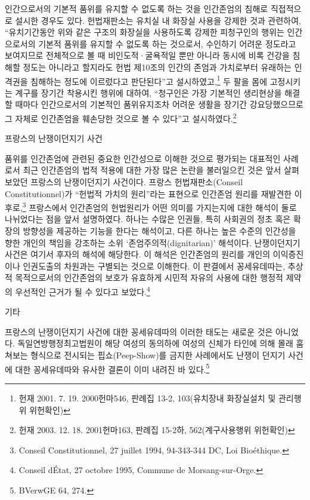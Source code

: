 인간으로서의 기본적 품위를 유지할 수 없도록 하는 것을 인간존엄의 침해로 직접적으로 설시한 경우도 있다. 헌법재판소는 유치실 내 화장실 사용을 강제한 것과 관련하여, ``유치기간동안 위와 같은 구조의 화장실을 사용하도록 강제한 피청구인의 행위는 인간으로서의 기본적 품위를 유지할 수 없도록 하는 것으로서, 수인하기 어려운 정도라고 보여지므로 전체적으로 볼 때 비인도적·굴욕적일 뿐만 아니라 동시에 비록 건강을 침해할 정도는 아니라고 할지라도 헌법 제10조의 인간의 존엄과 가치로부터 유래하는 인격권을 침해하는 정도에 이르렀다고 판단된다''고 설시하였고,\footnote{헌재 2001. 7. 19. 2000헌마546, 판례집 13-2, 103(유치장내 화장실설치 및 관리행위 위헌확인)} 두 팔을 몸에 고정시키는 계구를 장기간 착용시킨 행위에 대하여, ``청구인은 가장 기본적인 생리현상을 해결할 때마다 인간으로서의 기본적인 품위유지조차 어려운 생활을 장기간 강요당했으므로 그 자체로 인간존엄을 훼손당한 것으로 볼 수 있다''고 설시하였다.\footnote{헌재 2003. 12. 18. 2001헌마163, 판례집 15-2하, 562(계구사용행위 위헌확인)}

프랑스의 난쟁이던지기 사건

품위를 인간존엄에 관련된 중요한 인간성으로 이해한 것으로 평가되는 대표적인 사례로서 최근 인간존엄의 법적 적용에 대한 가장 많은 논란을 불러일으킨 것은 앞서 살펴보았던 프랑스의 난쟁이던지기 사건이다. 프랑스 헌법재판소(Conseil Constitutionnel)가 ``헌법적 가치의 원리''라는 표현으로 인간존엄 원리를 재발견한 이후로,\footnote{Conseil Constitutionnel, 27 juillet 1994, 94-343-344 DC, Loi Bioéthique.} 프랑스에서 인간존엄의 헌법원리가 어떤 의미를 가지는지에 대한 해석이 둘로 나뉘었다는 점을 앞서 설명하였다. 하나는 수많은 인권들, 특히 사회권의 정초 혹은 확장의 방향성을 제공하는 기능을 한다는 해석이고, 다른 하나는 높은 수준의 인간성을 향한 개인의 책임을 강조하는 소위 `존엄주의적(dignitarian)' 해석이다. 난쟁이던지기 사건은 여기서 후자의 해석에 해당한다. 이 해석은 인간존엄의 원리를 개인의 이익증진이나 인권도출의 차원과는 구별되는 것으로 이해한다. 이 판결에서 꽁세유데따는, 추상적 목적으로서의 인간존엄의 보호가 유효하게 시민적 자유의 사용에 대한 행정적 제약의 우선적인 근거가 될 수 있다고 보았다.\footnote{Conseil d\textquotesingle État, 27 octobre 1995, Commune de Morsang-sur-Orge.}

기타

프랑스의 난쟁이던지기 사건에 대한 꽁세유데따의 이러한 태도는 새로운 것은 아니었다. 독일연방행정최고법원이 해당 여성의 동의하에 여성의 신체가 타인에 의해 몰래 훔쳐보는 형식으로 전시되는 핍쇼(Peep-Show)를 금지한 사례에서도 난쟁이 던지기 사건에 대한 꽁세유데따와 유사한 결론이 이미 내려진 바 있다.\footnote{BVerwGE 64, 274.}


